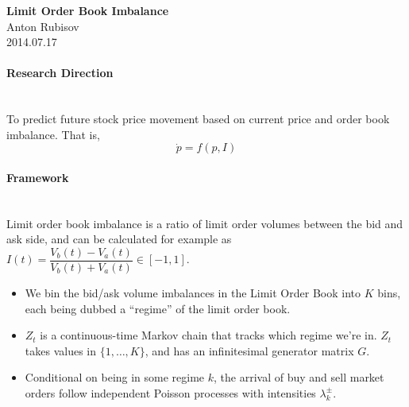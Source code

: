 \documentclass[12pt]{report}
\begin{document}

\vspace*{0.25in}
\begin{center}
{\Large\bf
Limit Order Book Imbalance}\\[2mm]
{\large Anton Rubisov}\\%
{\small 2014.07.17}
\end{center}

\paragraph{Research Direction} \mbox{} \\

To predict future stock price movement based on current price and order book imbalance. That is,
$$ \dot{p} = f(p,I)$$

\paragraph{Framework} \mbox{} \\

Limit order book imbalance is a ratio of limit order volumes between the bid and ask side, and can be calculated for example as $I(t) = \dfrac{V_b(t) - V_a(t)}{V_b(t) + V_a(t)} \in [-1,1]$.
\begin{itemize}
\item We bin the bid/ask volume imbalances in the Limit Order Book into $K$ bins, each being dubbed a ``regime'' of the limit order book. 
\item $Z_t$ is a continuous-time Markov chain that tracks which regime we're in. $Z_t$ takes values in $\{1, \dots , K\}$, and has an infinitesimal generator matrix $G$.
\item Conditional on being in some regime $k$, the arrival of buy and sell market orders follow independent Poisson processes with intensities $\lambda^{\pm}_k$.
\end{itemize}
\end{document}
